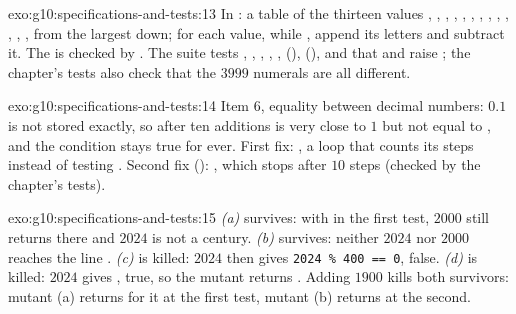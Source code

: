 \begin{solution}{exo:g10:specifications-and-tests:13}
In : a table of the thirteen values , , ,
, , , , , , , ,
, , from the largest down; for each value, while , append its letters and
subtract it. The  is checked by . The suite tests ,
, , , ,  (),  (), and that
 and  raise ; the chapter's tests also check that the $3999$ numerals are all
different.
\end{solution}

\begin{solution}{exo:g10:specifications-and-tests:14}
Item 6, equality between decimal numbers: $0.1$ is not stored exactly, so after ten additions  is very
close to $1$ but not equal to , and the condition  stays true for ever. First fix:
, a loop that counts its steps instead of testing . Second fix
(): , which stops after $10$ steps (checked by the
chapter's tests).
\end{solution}

\begin{solution}{exo:g10:specifications-and-tests:15}
\emph{(a)} survives: with  in the first test, $2000$ still returns  there and $2024$ is not a
century. \emph{(b)} survives: neither $2024$ nor $2000$ reaches the line . \emph{(c)} is killed:
$2024$ then gives \texttt{2024 \% 400 == 0}, false. \emph{(d)} is killed: $2024$ gives , true, so the
mutant returns . Adding $1900$ kills both survivors: mutant (a) returns  for it at the first
test, mutant (b) returns  at the second.
\end{solution}

